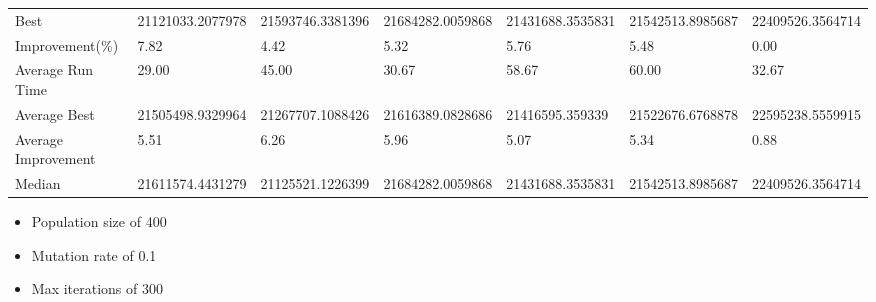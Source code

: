 \begin{table}[H]
{\begin{tabular}{lllllll}
\cellcolor[HTML]{ECF4FF}Best                & 21121033.2077978 & 21593746.3381396 & 21684282.0059868 & 21431688.3535831 & 21542513.8985687 & 22409526.3564714 \\
\cellcolor[HTML]{ECF4FF}Improvement(\%)     & 7.82             & 4.42             & 5.32             & 5.76             & 5.48             & 0.00             \\
\rowcolor[HTML]{CBCEFB} 
\cellcolor[HTML]{DAE8FC}Average Run Time    & 29.00            & 45.00            & 30.67            & 58.67            & 60.00            & 32.67            \\
\rowcolor[HTML]{CBCEFB} 
\cellcolor[HTML]{DAE8FC}Average Best        & 21505498.9329964 & 21267707.1088426 & 21616389.0828686 & 21416595.359339  & 21522676.6768878 & 22595238.5559915 \\
\rowcolor[HTML]{CBCEFB} 
\cellcolor[HTML]{DAE8FC}Average Improvement & 5.51             & 6.26             & 5.96             & 5.07             & 5.34             & 0.88             \\
\rowcolor[HTML]{CBCEFB} 
\cellcolor[HTML]{DAE8FC}Median              & 21611574.4431279 & 21125521.1226399 & 21684282.0059868 & 21431688.3535831 & 21542513.8985687 & 22409526.3564714
\end{tabular}%
}
\end{table}

\begin{itemize}
  \item Population size of 400
  \item Mutation rate of 0.1
  \item Max iterations of 300
\end{itemize}

